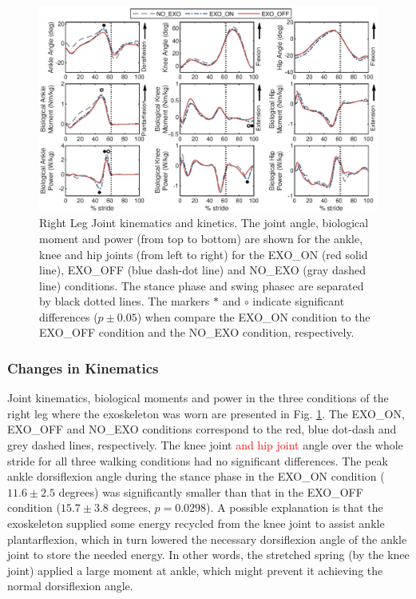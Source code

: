 \documentclass[twocolumn,cleanfoot,10pt]{asme2ej}
\begin{document}
\begin{figure}[th]
	\centering
	\includegraphics[width=17cm]{compare.eps}
	\caption{Right Leg Joint kinematics and kinetics.
	The joint angle, biological moment and power (from top to bottom) are shown for the ankle, knee and hip joints (from left to right) for the EXO\_ON (red solid line), EXO\_OFF (blue dash-dot line) and NO\_EXO (gray dashed line) conditions.
	The stance phase and swing phasec are separated by black dotted lines.
	The markers $*$ and $\circ$ indicate significant differences ($p\pm0.05$) when compare the EXO\_ON condition to the EXO\_OFF condition and the NO\_EXO condition, respectively.}
	\label{fig:kinetics_r}
\end{figure}

\subsubsection{Changes in Kinematics}
Joint kinematics, biological moments and power in the three conditions of the right leg where the exoskeleton was worn are presented in Fig. \ref{fig:kinetics_r}.
The EXO\_ON, EXO\_OFF and NO\_EXO conditions correspond to the red, blue dot-dash and grey dashed lines, respectively.
The knee joint \textcolor{red}{and hip joint} angle over the whole stride for all three walking conditions had no significant differences.
The peak ankle dorsiflexion angle during the stance phase in the EXO\_ON condition ($11.6\pm2.5$ degrees) was significantly smaller than that in the EXO\_OFF condition ($15.7\pm3.8$ degrees, $p=0.0298$).
A possible explanation is that the exoskeleton supplied some energy recycled from the knee joint to assist ankle plantarflexion, which in turn lowered the necessary dorsiflexion angle of the ankle joint to store the needed energy.
In other words, the stretched spring (by the knee joint) applied a large moment at ankle, which might prevent it achieving the normal dorsiflexion angle.
\end{document}
